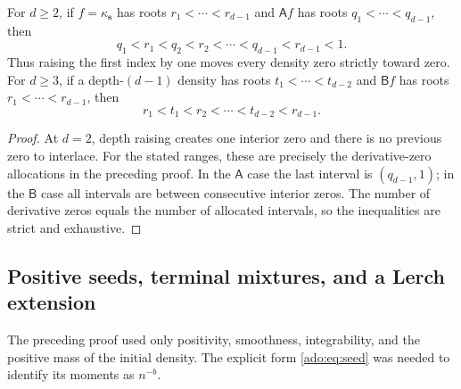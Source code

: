 \begin{corollary}
\label{ado:cor:interlacing}
For $d\ge2$, if $f=\kappa_{\boldsymbol{s}}$ has roots $r_1<\cdots<r_{d-1}$ and
$\mathsf{A} f$ has roots $q_1<\cdots<q_{d-1}$, then
\begin{equation}\label{ado:eq:Ainterlace}
 q_1<r_1<q_2<r_2<\cdots<q_{d-1}<r_{d-1}<1.
\end{equation}
Thus raising the first index by one moves every density zero strictly
toward zero. For $d\ge3$, if a depth-$(d-1)$ density has roots
$t_1<\cdots<t_{d-2}$ and $\mathsf{B} f$ has roots $r_1<\cdots<r_{d-1}$,
then
\begin{equation}\label{ado:eq:Binterlace}
 r_1<t_1<r_2<\cdots<t_{d-2}<r_{d-1}.
\end{equation}
\end{corollary}
\begin{proof}
At $d=2$, depth raising creates one interior zero and there is no
previous zero to interlace. For the stated ranges, these are precisely the
derivative-zero allocations in the preceding
proof. In the $\mathsf{A}$ case the last interval is $(q_{d-1},1)$; in the
$\mathsf{B}$ case all intervals are between consecutive interior zeros.
The number of derivative zeros equals the number of allocated intervals,
so the inequalities are strict and exhaustive.
\end{proof}

\subsection{Positive seeds, terminal mixtures, and a Lerch extension}
The preceding proof used only positivity, smoothness, integrability, and
the positive mass of the initial density. The explicit form
\eqref{ado:eq:seed} was needed to identify its moments as $n^{-b}$.

